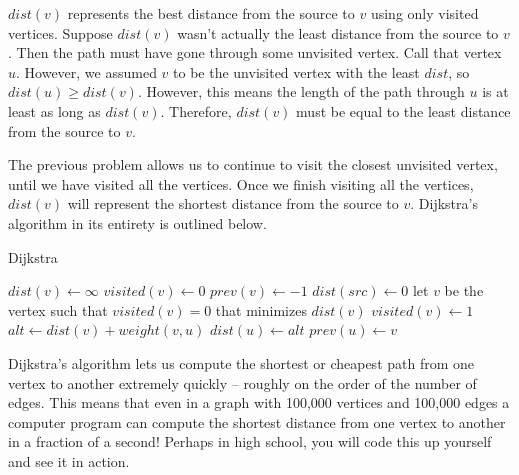 \documentclass[11pt]{article}
\begin{document}
\begin{solution}
$dist(v)$ represents the best distance from the source to $v$ using only visited vertices. Suppose $dist(v)$ wasn't actually the least
distance from the source to $v$. Then the path must have gone through some unvisited vertex. Call that vertex $u$. However, we assumed $v$ to be the unvisited vertex
with the least $dist$, so $dist(u) \ge dist(v)$. However, this means the length of the path through $u$ is at least as long as $dist(v)$.
Therefore, $dist(v)$ must be equal to the least distance from the source to $v$.
\end{solution}

The previous problem allows us to continue to visit the closest unvisited vertex, until we have visited all the vertices. Once we finish visiting all the vertices,
$dist(v)$ will represent the shortest distance from the source to $v$. Dijkstra's algorithm in its entirety is outlined below.

\begin{algorithm}[H]
\caption{Dijkstra}
\begin{algorithmic}
	\State $dist(v) \gets \infty$ 
	\State $visited(v) \gets 0$ 
    \State $prev(v) \gets -1$ 
\EndFor
\State $dist(src) \gets 0$ 
	\State let $v$ be the vertex such that $visited(v)=0$ that minimizes $dist(v)$
    \State $visited(v) \gets 1$ 
    		\State $alt \gets dist(v) + weight(v, u)$
				\State $dist(u) \gets alt$ 
   	        	\State $prev(u) \gets v$
			\EndIf
        \EndIf
    \EndFor
\EndWhile
\end{algorithmic}
\end{algorithm}

Dijkstra's algorithm lets us compute the shortest or cheapest path from one vertex to another extremely quickly -- roughly on the order of the number of edges.
This means that even in a graph with 100,000 vertices and 100,000 edges a computer program can compute the shortest distance from one vertex to another in a fraction of 
a second! Perhaps in high school, you will code this up yourself and see it in action.
\end{document}
